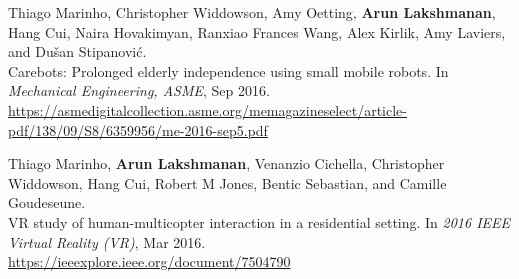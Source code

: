 \documentclass[11pt]{article}
\newenvironment{lonelist}[1][\enskip\textbullet]%
        {\vspace{-\baselineskip}\begin{list}{#1}{%
        \setlength{\partopsep}{0pt}%
        \setlength{\topsep}{0pt}}}
        {\end{list}\vspace{-.6\baselineskip}}
\begin{document}
\begin{lonelist}
\item[] Thiago Marinho, Christopher Widdowson, Amy Oetting, \textbf{Arun Lakshmanan}, Hang Cui, Naira Hovakimyan, Ranxiao Frances Wang, Alex Kirlik, Amy Laviers, and Dušan Stipanović.\\
Carebots: Prolonged elderly independence using small mobile robots. In \textit{Mechanical Engineering, ASME}, Sep 2016. \\
\url{https://asmedigitalcollection.asme.org/memagazineselect/article-pdf/138/09/S8/6359956/me-2016-sep5.pdf} \bigskip

\item[] Thiago Marinho, \textbf{Arun Lakshmanan}, Venanzio Cichella, Christopher Widdowson, Hang Cui, Robert M Jones, Bentic Sebastian, and Camille Goudeseune.\\
VR study of human-multicopter interaction in a residential setting. In \textit{2016 IEEE Virtual Reality (VR)}, Mar 2016. \\
\url{https://ieeexplore.ieee.org/document/7504790} 

\end{lonelist}
\end{document}
